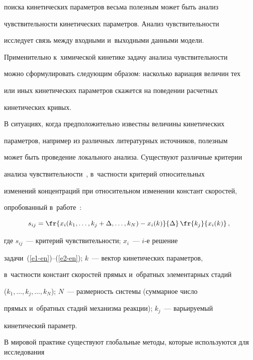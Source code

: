 поиска кинетических параметров весьма полезным может быть анализ 


чувствительности кинетических параметров. Анализ чувствительности 


исследует связь между входными и~выходными данными модели. 


Применительно к~химической кинетике задачу анализа чувствительности 


можно сформулировать следующим образом: насколько вариация величин тех 


или иных кинетических параметров скажется на поведении расчетных 


кинетических кривых.


  


  В ситуациях, когда предположительно известны величины кинетических 


параметров, например из различных литературных источников, полезным 


может быть проведение локального анализа. Существуют различные критерии 


анализа чувствительности~\cite{2-en}, в~част\-ности критерий относительных 


изменений концентраций при относительном изменении констант скоростей, 


опробованный в~работе~\cite{3-en}:


  \begin{equation*}


  s_{ij}= \fr{x_i(k_1, \ldots ,k_j+\Delta, \ldots , k_N)-x_i(k)}{\Delta}\,\fr{k_j}{x_i(k)}\,,




  \end{equation*}


где $s_{ij}$~--- критерий чувствительности; $x_i$~--- $i$-е решение  


задачи~(\ref{e1-en})--(\ref{e2-en}); $k$~--- вектор кинетических параметров, 


в~частности констант скоростей прямых и~обратных элементарных стадий 


($k_1, \ldots , k_j, \ldots , k_N$); $N$~--- размерность системы (суммарное число 


прямых и~обратных стадий механизма реакции); $k_j$~--- варьируемый 


кинетический параметр.


  


  В мировой практике существуют глобальные методы, которые используются для исследования 


